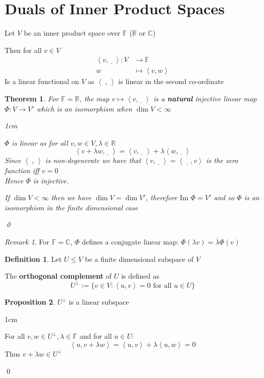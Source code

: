 \documentclass[11pt, a4paper]{report}
\makeatletter
\numberwithin{equation}{section}
\newcommand{\R}{\mathbb{R}}
\newcommand{\C}{\mathbb{C}}
\newcommand{\F}{\mathbb{F}}
\newcommand{\blnk}{\underline{\;\;}\,}
\newcommand{\alnk}{\,\underline{\;\;}\,}
\newcommand{\spn}[1]{\left\langle #1 \right\rangle}
\newcommand{\spb}{\spn{\;,\,}}
\newcommand{\im}{\text{Im }}
\numberwithin{equation}{subsection}
\theoremstyle{plain}
\newtheorem{thm}{Theorem}[chapter] %
\theoremstyle{definition}
\newtheorem{defn}{Definition}[chapter]
\newtheorem{prop}[thm]{Proposition}
\theoremstyle{remark}
\newtheorem*{rem}{Remark}
\newtheorem*{prf}{Proof}
\renewenvironment{prf}[1][\proofname]{\par
  \vspace{-\topsep}%
  \normalfont
  \topsep0pt \partopsep0pt %
  \trivlist
  \item[\hskip\labelsep
        \itshape
    #1\@addpunct{.}]\ignorespaces
}{%
  \popQED\endtrivlist\@endpefalse
  \addvspace{6pt plus 6pt} %
}
\newcommand{\pr}[1]{\begin{adjustwidth}{1cm}{} \begin{prf} #1 \end{prf} \end{adjustwidth}}
\makeatother
\begin{document}
\newpage
\section{Duals of Inner Product Spaces}

Let $V$ be an inner product space over $\F$ ($\R$ or $\C$)

Then for all $v \in V$
\begin{align*}
\spn{v,\underline{\;\;}\,} : V &\to \F\\
						w &\mapsto \spn{v,w}
\end{align*}
Is a linear functional on $V$ as $\spb$ is linear in the second co-ordinate

\begin{thm}
For $\F = \R$, the map $v \mapsto \spn{v, \underline{\;\;}\,}$ is a \textbf{natural} injective linear map $\Phi: V \to V'$ which is an isomorphism when $\dim V < \infty$

\pr{
$\Phi$ is linear as for all $v,w \in V, \lambda \in \R$
$$\spn{v + \lambda w, \blnk} = \spn{v, \blnk} + \lambda \spn{w, \blnk}$$
Since $\spb$ is non-degenerate we have that $\spn{v, \blnk} = \spn{ \alnk, v}$ is the zero function iff $v = 0$\\ Hence $\Phi$ is injective.

If $\dim V < \infty$ then we have $\dim V = \dim V'$, therefore $\im \Phi = V'$ and so $\Phi$ is an isomorphism in the finite dimensional case
}\qed
\end{thm}

\begin{rem} 
For $\F = \C$, $\Phi$ defines a conjugate linear map: $\Phi(\lambda v) = \overline{\lambda}\Phi(v)$
\end{rem}

\begin{defn}
Let $U \leq V$ be a finite dimensional subspace of $V$

The \textbf{orthogonal complement} of $U$ is defined as
$$U^\perp := \{ v \in V : \spn{u,v} = 0 \text{ for all } u \in U \}$$

\end{defn}

\begin{prop}
$U^\perp$ is a linear subspace

\pr{
For all $v, w \in U^\perp, \lambda \in \F$ and for all $u \in U$:
$$\spn{u, v + \lambda w} = \spn{u, v} + \lambda \spn{u,w} = 0$$
Thus $v + \lambda w \in U^\perp$
}\qed
\end{prop}
\end{document}
